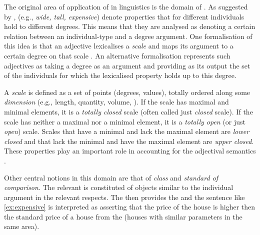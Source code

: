 The original area of application of  in linguistics is the domain of . As suggested by \citet{Kennedy:99},  (e.g., \textit{wide, tall, expensive}) denote properties that for different individuals hold to different degrees. This means that they are analysed as denoting a certain relation between an individual-type and a degree argument. One formalisation of this idea is that an adjective lexicalises a \textit{scale} and maps its argument to a certain degree on that scale \citep{Kennedy:01, KennedyLevin:02}. An alternative formalisation \citep[e.g.,][]{Heim:00} represents such adjectives as taking a degree as an argument and providing as its output the set of the individuals for which the lexicalised property holds up to this degree.

 A \textit{scale} is defined as a set of points (degrees, values), %
 totally ordered along some \textit{dimension} (e.g., length, quantity, volume, ). If the scale has maximal and minimal elements, it is a \textit{totally closed} scale (often called just \textit{closed} scale). If the scale has neither a maximal nor a minimal element, it is a \textit{totally open} (or just \textit{open}) scale. Scales that have a minimal and lack the maximal element are \textit{lower closed} and  that lack the minimal and have the maximal element are \textit{upper closed}. These properties play an important role in accounting for the adjectival semantics \citep[see, e.g.,][]{KennedyMcNally:05, RotsteinWinter:04, KaganAlexeyenko:10}.
 
Other central notions in this domain are that of \textit{ class} and \textit{standard of comparison}. The relevant  \citep[see, e.g.][]{Klein:80, KennedyMcNally:05, Kennedy:07} is constituted of objects similar to the individual argument in the relevant respects. The  then provides the  and the sentence like \ref{ex:expensive} is interpreted as asserting that the price of the house is higher then the standard price of a house from the  (houses with similar parameters in the same area).
 
